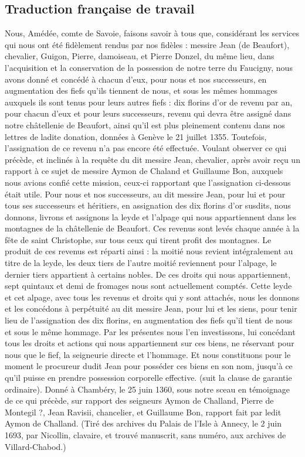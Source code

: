 \documentclass[a4paper,twoside,openany]{article}
\begin{document}
\subsection{Traduction française de travail}


Nous, Amédée, comte de Savoie, faisons savoir à tous que,
considérant les services qui nous ont été fidèlement rendus
par nos fidèles : messire Jean (de Beaufort), chevalier,
Guigon, Pierre, damoiseau, et Pierre Donzel, du même lieu,
dans l’acquisition et la conservation de la possession de
notre terre du Faucigny, nous avons donné et concédé à
chacun d’eux, pour nous et nos successeurs, en
augmentation des fiefs qu’ils tiennent de nous, et sous les
mêmes hommages auxquels ils sont tenus pour leurs autres
fiefs : dix florins d’or de revenu par an, pour chacun d’eux et
pour leurs successeurs, revenu qui devra être assigné dans
notre châtellenie de Beaufort, ainsi qu’il est plus pleinement
contenu dans nos lettres de ladite donation, données à
Genève le 21 juillet 1355. Toutefois, l’assignation de ce
revenu n’a pas encore été effectuée.
Voulant observer ce qui précède, et inclinés à la requête du
dit messire Jean, chevalier, après avoir reçu un rapport à ce
sujet de messire Aymon de Chaland et Guillaume Bon,
auxquels nous avions confié cette mission, ceux-ci
rapportant que l’assignation ci-dessous était utile.
Pour nous et nos successeurs, au dit messire Jean, pour lui et
pour tous ses successeurs et héritiers, en assignation des dix
florins d’or susdits, nous donnons, livrons et assignons la
leyde et l’alpage qui nous appartiennent dans les montagnes
de la châtellenie de Beaufort.
Ces revenus sont levés chaque année à la fête de saint
Christophe, sur tous ceux qui tirent profit des montagnes. Le
produit de ces revenus est réparti ainsi : la moitié nous
revient intégralement au titre de la leyde, les deux tiers de
l’autre moitié reviennent pour l’alpage, le dernier tiers
appartient à certains nobles. De ces droits qui nous
appartiennent, sept quintaux et demi de fromages nous sont
actuellement comptés. Cette leyde et cet alpage, avec tous
les revenus et droits qui y sont attachés, nous les donnons et
les concédons à perpétuité au dit messire Jean, pour lui et
les siens, pour tenir lieu de l’assignation des dix florins, en
augmentation des fiefs qu’il tient de nous et sous le même
hommage. Par les présentes nous l’en investissons, lui
concédant tous les droits et actions qui nous appartiennent
sur ces biens, ne réservant pour nous que le fief, la
seigneurie directe et l’hommage. Et nous constituons pour le
moment le procureur dudit Jean pour posséder ces biens en
son nom, jusqu’à ce qu’il puisse en prendre possession
corporelle effective. (suit la clause de garantie ordinaire).
Donné à Chambéry, le 25 juin 1360, sous notre sceau en
témoignage de ce qui précède, sur rapport des seigneurs
Aymon de Challand, Pierre de Montegil ?, Jean Ravisii,
chancelier, et Guillaume Bon, rapport fait par ledit Aymon de
Challand.
(Tiré des archives du Palais de l’Isle à Annecy, le 2 juin 1693,
par Nicollin, clavaire, et trouvé manuscrit, sans numéro, aux
archives de Villard-Chabod.)
\end{document}
